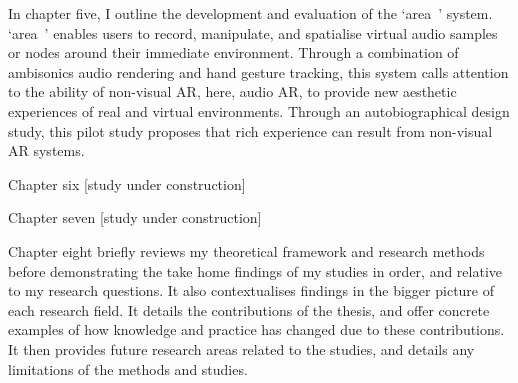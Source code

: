 In chapter five, I outline the development and evaluation of the ‘area~’ system. ‘area~’ enables users to record, manipulate, and spatialise virtual audio samples or nodes around their immediate environment. Through a combination of ambisonics audio rendering and hand gesture tracking, this system calls attention to the ability of non-visual AR, here, audio AR, to provide new aesthetic experiences of real and virtual environments. Through an autobiographical design study, this pilot study proposes that rich experience can result from non-visual AR systems. 

Chapter six [study under construction]

Chapter seven [study under construction]

Chapter eight briefly reviews my theoretical framework and research methods before demonstrating the take home findings of my studies in order, and relative to my research questions. It also contextualises findings in the bigger picture of each research field. It details the contributions of the thesis, and offer concrete examples of how knowledge and practice has changed due to these contributions. It then provides future research areas related to the studies, and details any limitations of the methods and studies.
